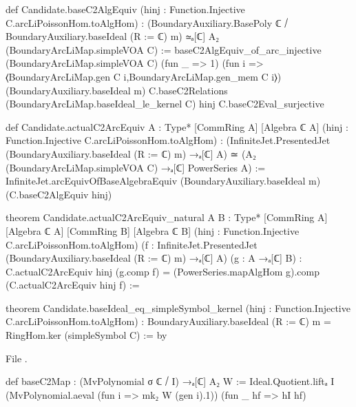 \begin{leancode}
def Candidate.baseC2AlgEquiv
    (hinj : Function.Injective C.arcLiPoissonHom.toAlgHom) :
    (BoundaryAuxiliary.BasePoly ℂ ⧸ BoundaryAuxiliary.baseIdeal (R := ℂ) m) ≃ₐ[ℂ]
      A₂ (BoundaryArcLiMap.simpleVOA C) :=
  baseC2AlgEquiv_of_arc_injective (BoundaryArcLiMap.simpleVOA C) (fun _ => 1)
    (fun i => ⟨BoundaryArcLiMap.gen C i,BoundaryArcLiMap.gen_mem C i⟩)
    (BoundaryAuxiliary.baseIdeal m) C.baseC2Relations (BoundaryArcLiMap.baseIdeal_le_kernel C)
    hinj C.baseC2Eval_surjective

def Candidate.actualC2ArcEquiv {A : Type*} [CommRing A] [Algebra ℂ A]
    (hinj : Function.Injective C.arcLiPoissonHom.toAlgHom) :
    (InfiniteJet.PresentedJet (BoundaryAuxiliary.baseIdeal (R := ℂ) m) →ₐ[ℂ] A) ≃
      (A₂ (BoundaryArcLiMap.simpleVOA C) →ₐ[ℂ] PowerSeries A) :=
  InfiniteJet.arcEquivOfBaseAlgebraEquiv (BoundaryAuxiliary.baseIdeal m) (C.baseC2AlgEquiv hinj)

theorem Candidate.actualC2ArcEquiv_natural {A B : Type*} [CommRing A] [Algebra ℂ A]
    [CommRing B] [Algebra ℂ B] (hinj : Function.Injective C.arcLiPoissonHom.toAlgHom)
    (f : InfiniteJet.PresentedJet (BoundaryAuxiliary.baseIdeal (R := ℂ) m) →ₐ[ℂ] A)
    (g : A →ₐ[ℂ] B) :
    C.actualC2ArcEquiv hinj (g.comp f) =
      (PowerSeries.mapAlgHom g).comp (C.actualC2ArcEquiv hinj f) :=

theorem Candidate.baseIdeal_eq_simpleSymbol_kernel
    (hinj : Function.Injective C.arcLiPoissonHom.toAlgHom) :
    BoundaryAuxiliary.baseIdeal (R := ℂ) m = RingHom.ker (simpleSymbol C) := by
\end{leancode}
\noindent File .
\begin{leancode}
def baseC2Map : (MvPolynomial σ ℂ ⧸ I) →ₐ[ℂ] A₂ W :=
  Ideal.Quotient.liftₐ I (MvPolynomial.aeval (fun i => mk₂ W (gen i).1)) (fun _ hf => hI hf)
\end{leancode}

